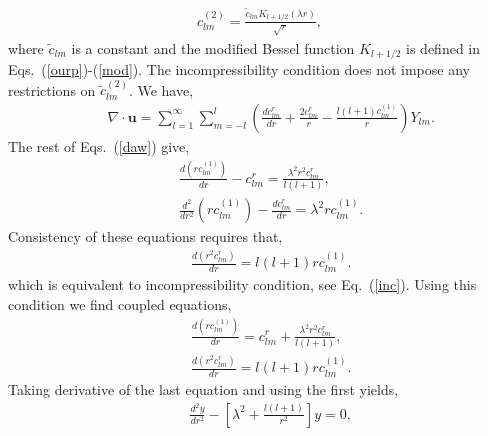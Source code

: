 \documentclass[aps,prx,twocolumn,amsmath,amssymb,amsfonts]{revtex4-2}
\begin{document}
{{\begin{appendices}
\begin{eqnarray}
c^{(2)}_{lm}=\frac{{\tilde c}_{lm} K_{l+1/2}(\lambda r)}{\sqrt{r}},\label{d2}
\end{eqnarray}
where ${\tilde c}_{lm}$ is a constant and the modified Bessel function $K_{l+1/2}$ is defined in Eqs.~(\ref{ourp})-(\ref{mod}).
The incompressibility condition does not impose any restrictions on ${\tilde c}^{(2)}_{lm}$. We have,
\begin{eqnarray}&&\!\!\!\!\!\!\!\!\!\!\!\!
\nabla\!\cdot\! \bm u\!=\!\sum_{l=1}^{\infty}\sum_{m=-l}^l \left(\frac{dc^r_{lm}}{dr}\!+\!\frac{2c^r_{lm}}{r}\!-\!\frac{l(l\!+\!1)c^{(1)}_{lm}}{r}\right)Y_{lm}.\label{inc}
\end{eqnarray}
The rest of Eqs.~(\ref{daw}) give,
\begin{eqnarray}&&\!\!\!\!\!\!\!\!\!\!\!\!
\frac{d(rc^{(1)}_{lm})}{dr}-c^r_{lm}=\frac{\lambda^2r^2c^{r}_{lm}}{l(l+1)},\nonumber\\&&\!\!\!\!\!\!\!\!\!\!\!\!
\frac{d^2}{dr^2}\left(rc^{(1)}_{lm}\right)-\frac{dc^r_{lm}}{dr}=\lambda^2rc^{(1)}_{lm}.
\end{eqnarray}
Consistency of these equations requires that,
\begin{eqnarray}&&\!\!\!\!\!\!\!\!\!\!\!\!
\frac{d\left(r^2c^r_{lm}\right)}{dr}=l(l+1)rc^{(1)}_{lm}. \label{consist}
\end{eqnarray}
which is equivalent to incompressibility condition, see Eq.~(\ref{inc}). Using this condition we find coupled equations,
\begin{eqnarray}&&\!\!\!\!\!\!\!\!\!\!\!\!
\frac{d(rc^{(1)}_{lm})}{dr}=c^r_{lm}+\frac{\lambda^2r^2c^{r}_{lm}}{l(l+1)},\nonumber\\&&\!\!\!\!\!\!\!\!\!\!\!\!
\frac{d\left(r^2c^r_{lm}\right)}{dr}=l(l+1)rc^{(1)}_{lm}.\label{c1}
\end{eqnarray}
Taking derivative of the last equation and using the first yields,
\begin{eqnarray}&&\!\!\!\!\!\!\!\!\!\!\!\!
\frac{d^2y}{dr^2}-\left[\lambda^2+\frac{l(l+1)}{r^2}\right]y=0, \label{radi}
\end{eqnarray}

\end{appendices}}}
\end{document}
